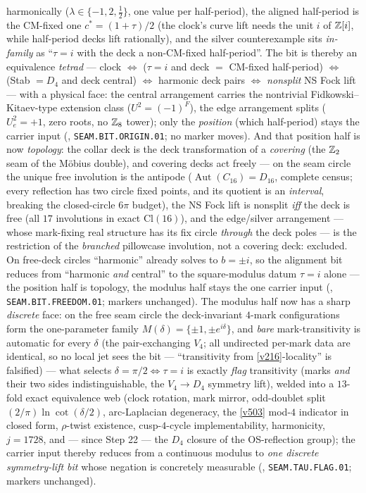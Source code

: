 harmonically ($\lambda\in\{-1,2,\tfrac12\}$, one value per half-period), the aligned half-period is
the CM-fixed one $c^*=(1{+}\tau)/2$ (the clock's curve lift needs the unit $i$ of $\mathbb{Z}[i]$, while
half-period decks lift rationally), and the silver counterexample sits \emph{in-family} as
``$\tau=i$ with the deck a non-CM-fixed half-period''. The bit is thereby an equivalence
\emph{tetrad} --- clock $\iff$ ($\tau{=}i$ and deck $=$ CM-fixed half-period) $\iff$ (Stab $=D_4$
and deck central) $\iff$ harmonic deck pairs $\iff$ \emph{nonsplit} NS Fock lift --- with a physical
face: the central arrangement carries the nontrivial Fidkowski--Kitaev-type extension class
($U^2=(-1)^F$), the edge arrangement splits ($U_e^2=+1$, zero roots, no $\mathbb{Z}_8$ tower); only the
\emph{position} (which half-period) stays the carrier input
(, \texttt{SEAM.BIT.ORIGIN.01}; no marker moves). And that position
half is now \emph{topology}: the collar deck is the deck transformation of a \emph{covering} (the
$\mathbb{Z}_2$ seam of the M\"obius double), and covering decks act freely --- on the seam circle the unique
free involution is the antipode ($\operatorname{Aut}(C_{16})=D_{16}$, complete census; every
reflection has two circle fixed points, and its quotient is an \emph{interval}, breaking the
closed-circle $6\pi$ budget), the NS Fock lift is nonsplit \emph{iff} the deck is free (all $17$
involutions in exact $\mathrm{Cl}(16)$), and the edge/silver arrangement --- whose mark-fixing real
structure has its fix circle \emph{through} the deck poles --- is the restriction of the
\emph{branched} pillowcase involution, not a covering deck: excluded. On free-deck circles
``harmonic'' already solves to $b=\pm i$, so the alignment bit reduces from ``harmonic \emph{and}
central'' to the square-modulus datum $\tau=i$ alone --- the position half is topology, the modulus
half stays the one carrier input
(, \texttt{SEAM.BIT.FREEDOM.01}; markers unchanged). The modulus
half now has a sharp \emph{discrete} face: on the free seam circle the deck-invariant $4$-mark
configurations form the one-parameter family $M(\delta)=\{\pm1,\pm e^{i\delta}\}$, and \emph{bare}
mark-transitivity is automatic for every $\delta$ (the pair-exchanging $V_4$; all undirected
per-mark data are identical, so no local jet sees the bit --- ``transitivity from
\vref{v216}-locality'' is falsified) --- what selects $\delta=\pi/2\iff\tau=i$ is exactly
\emph{flag} transitivity (marks \emph{and} their two sides indistinguishable, the $V_4\to D_4$
symmetry lift), welded into a $13$-fold exact equivalence web (clock rotation, mark mirror,
odd-doublet split $(2/\pi)\ln\cot(\delta/2)$, arc-Laplacian degeneracy, the \vref{v503} mod-$4$
indicator in closed form, $\rho$-twist existence, cusp-$4$-cycle implementability, harmonicity,
$j=1728$, and --- since Step 22 --- the $D_4$ closure of the OS-reflection group); the carrier
input thereby reduces from a continuous modulus to \emph{one discrete
symmetry-lift bit} whose negation is concretely measurable
(, \texttt{SEAM.TAU.FLAG.01}; markers unchanged).

